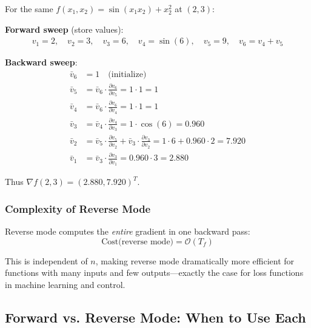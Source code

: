 \begin{example}
\label{ex:reverse_mode}
For the same $f(x_1, x_2) = \sin(x_1 x_2) + x_2^2$ at $(2, 3)$:

\textbf{Forward sweep} (store values):
\begin{align}
v_1 = 2, \quad v_2 = 3, \quad v_3 = 6, \quad v_4 = \sin(6), \quad v_5 = 9, \quad v_6 = v_4 + v_5
\end{align}

\textbf{Backward sweep}:
\begin{align}
\bar{v}_6 &= 1 \quad \text{(initialize)} \\
\bar{v}_5 &= \bar{v}_6 \cdot \frac{\partial v_6}{\partial v_5} = 1 \cdot 1 = 1 \\
\bar{v}_4 &= \bar{v}_6 \cdot \frac{\partial v_6}{\partial v_4} = 1 \cdot 1 = 1 \\
\bar{v}_3 &= \bar{v}_4 \cdot \frac{\partial v_4}{\partial v_3} = 1 \cdot \cos(6) = 0.960 \\
\bar{v}_2 &= \bar{v}_5 \cdot \frac{\partial v_5}{\partial v_2} + \bar{v}_3 \cdot \frac{\partial v_3}{\partial v_2} = 1 \cdot 6 + 0.960 \cdot 2 = 7.920 \\
\bar{v}_1 &= \bar{v}_3 \cdot \frac{\partial v_3}{\partial v_1} = 0.960 \cdot 3 = 2.880
\end{align}

Thus $\nabla f(2,3) = (2.880, 7.920)^T$.
\end{example}

\subsubsection{Complexity of Reverse Mode}

Reverse mode computes the \textit{entire} gradient in one backward pass:
\begin{equation}
\text{Cost(reverse mode)} = \mathcal{O}(T_f)
\end{equation}

This is independent of $n$, making reverse mode dramatically more efficient for functions with many inputs and few outputs---exactly the case for loss functions in machine learning and control.

\subsection{Forward vs. Reverse Mode: When to Use Each}

